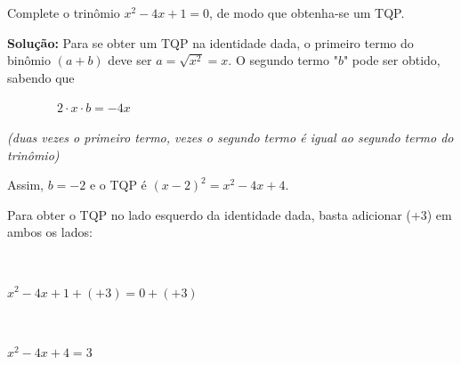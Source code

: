 \begin{texemplo}
Complete o trinômio $x^2 - 4x + 1 = 0$, de modo que obtenha-se um TQP.

\textbf{Solução:} Para se obter um TQP na identidade dada, o primeiro termo do binômio $(a+b)$ deve ser $a=\sqrt{x^2}=x$. O segundo termo "$b$" pode ser obtido, sabendo que

\begin{multicols}{2}
\item ~~~~~~~~$2 \cdot x \cdot b = -4x$

\item \textit{(duas vezes o primeiro termo, vezes o segundo termo é igual ao segundo termo do trinômio)}
\end{multicols}

Assim, $b = -2$ e o TQP é $(x-2)^2 = x^2 - 4x + 4$.

Para obter o TQP no lado esquerdo da identidade dada, basta adicionar (+3) em ambos os lados:

~~

$x^2 - 4x +1 +(+3) = 0 +(+3)$

~

$x^2 -4x + 4  = 3$ \qedsymbol{}

\end{texemplo}

